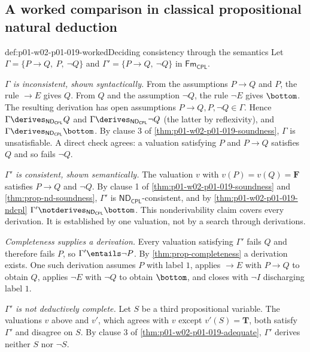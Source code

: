 \subsection{A worked comparison in classical propositional natural deduction}
\label{sec:p01-w02-p01-019-worked}

\begin{hbexample}{def:p01-w02-p01-019-worked}{Deciding consistency through the semantics}
Let \(\Gamma=\{P\to Q,\ P,\ \neg Q\}\) and \(\Gamma'=\{P\to Q,\ \neg Q\}\) in
\(\mathsf{Fm}_{\mathsf{CPL}}\).

\emph{\(\Gamma\) is inconsistent, shown syntactically.} From the assumptions
\(P\to Q\) and \(P\), the rule \(\to E\) gives \(Q\). From \(Q\) and the
assumption \(\neg Q\), the rule \(\neg E\) gives \(\bottom\). The resulting
derivation has open assumptions \(P\to Q,P,\neg Q\in\Gamma\). Hence
\(\Gamma\derives_{\mathsf{ND}_{\mathsf{CPL}}}Q\) and
\(\Gamma\derives_{\mathsf{ND}_{\mathsf{CPL}}}\neg Q\) (the latter by
reflexivity), and \(\Gamma\derives_{\mathsf{ND}_{\mathsf{CPL}}}\bottom\). By
clause 3 of \cref{thm:p01-w02-p01-019-soundness}, \(\Gamma\) is
unsatisfiable. A direct check agrees: a valuation satisfying \(P\) and
\(P\to Q\) satisfies \(Q\) and so fails \(\neg Q\).

\emph{\(\Gamma'\) is consistent, shown semantically.} The valuation \(v\) with
\(v(P)=v(Q)=\mathbf F\) satisfies \(P\to Q\) and \(\neg Q\). By clause 1 of
\cref{thm:p01-w02-p01-019-soundness} and
\cref{thm:prop-nd-soundness}, \(\Gamma'\) is
\(\mathsf{ND}_{\mathsf{CPL}}\)-consistent, and by
\cref{thm:p01-w02-p01-019-ndcpl}
\(\Gamma'\notderives_{\mathsf{ND}_{\mathsf{CPL}}}\bottom\). This
nonderivability claim covers every derivation. It is established by one
valuation, not by a search through derivations.

\emph{Completeness supplies a derivation.} Every valuation satisfying
\(\Gamma'\) fails \(Q\) and therefore fails \(P\), so
\(\Gamma'\entails\neg P\). By \cref{thm:prop-completeness} a derivation
exists. One such derivation assumes \(P\) with label \(1\), applies
\(\to E\) with \(P\to Q\) to obtain \(Q\), applies \(\neg E\) with \(\neg Q\)
to obtain \(\bottom\), and closes with \(\neg I\) discharging label \(1\).

\emph{\(\Gamma'\) is not deductively complete.} Let \(S\) be a third
propositional variable. The valuations \(v\) above and \(v'\), which agrees
with \(v\) except \(v'(S)=\mathbf T\), both satisfy \(\Gamma'\) and disagree on
\(S\). By clause 3 of \cref{thm:p01-w02-p01-019-adequate}, \(\Gamma'\) derives
neither \(S\) nor \(\neg S\).
\end{hbexample}

